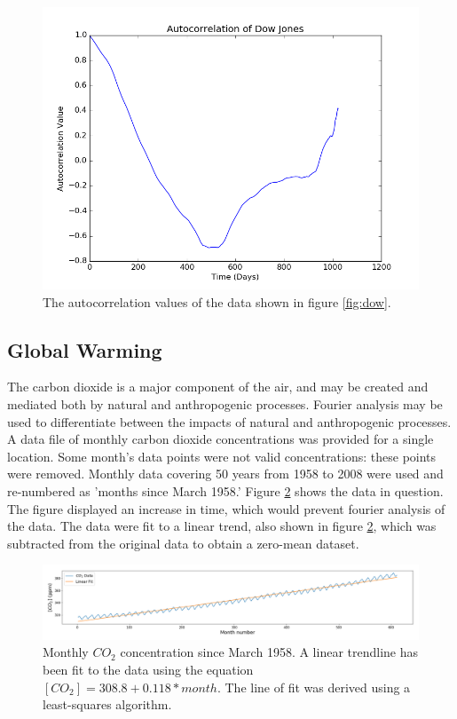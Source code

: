 \documentclass[twocolumn]{article}
\begin{document}
\begin{figure}
  \includegraphics[width=\linewidth]{dow_ac.png}
  \caption{
    The autocorrelation values of the data shown in figure \ref{fig:dow}.
  }
  \label{fig:dow_ac}
\end{figure}

\subsection{Global Warming}
The carbon dioxide is a major component of the air, and may be created and mediated both by natural and anthropogenic processes. Fourier analysis may be used to differentiate between the impacts of natural and anthropogenic processes. A data file of monthly carbon dioxide concentrations was provided for a single location. Some month's data points were not valid concentrations: these points were removed. Monthly data covering 50 years from 1958 to 2008 were used and re-numbered as 'months since March 1958.' Figure \ref{fig:co2trend} shows the data in question. The figure displayed an increase in time, which would prevent fourier analysis of the data. The data were fit to a linear trend, also shown in figure \ref{fig:co2trend}, which was subtracted from the original data to obtain a zero-mean dataset. 

\begin{figure}
\centering
\includegraphics[width=\textwidth]{co2trend}
\caption{Monthly $CO_2$ concentration since March 1958. A linear trendline has been fit to the data using the equation $[CO_2] = 308.8 + 0.118*month$. The line of fit was derived using a least-squares algorithm.}
\label{fig:co2trend}
\end{figure}
\end{document}
